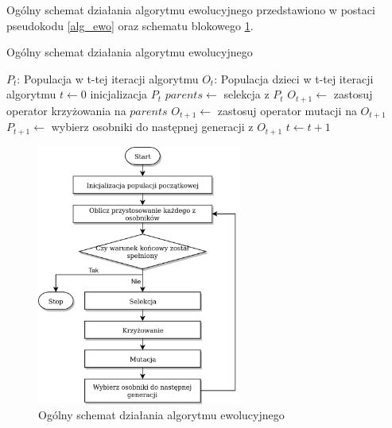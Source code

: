 Ogólny schemat działania algorytmu ewolucyjnego przedstawiono w postaci pseudokodu \ref{alg_ewo} oraz schematu blokowego \ref{alg_ewo_img}.

\begin{pseudokod}[H]
\label{alg_ewo}
    \caption{Ogólny schemat działania algorytmu ewolucyjnego}
    $P_t$: Populacja w t-tej iteracji algorytmu\;
    $O_t$: Populacja dzieci w t-tej iteracji algorytmu\;
    \BlankLine
    $t \gets 0$\;
    inicjalizacja $P_t$\;
    \BlankLine
     {
        $parents \gets$ selekcja z $P_t$\;
        $O_{t+1} \gets$ zastosuj operator krzyżowania na $parents$\;
        $O_{t+1} \gets$ zastosuj operator mutacji na $O_{t+1}$\;
        $P_{t+1} \gets$ wybierz osobniki do następnej generacji z $O_{t+1}$\;
        $t \gets t+1$\;
    }
    \;
\end{pseudokod}

\begin{figure}[H]
    \centering        
    \includegraphics[width=0.6\textwidth]{img/alg_ewo_szkic.png}
    \caption{Ogólny schemat działania algorytmu ewolucyjnego}
    \label{alg_ewo_img}
\end{figure}

